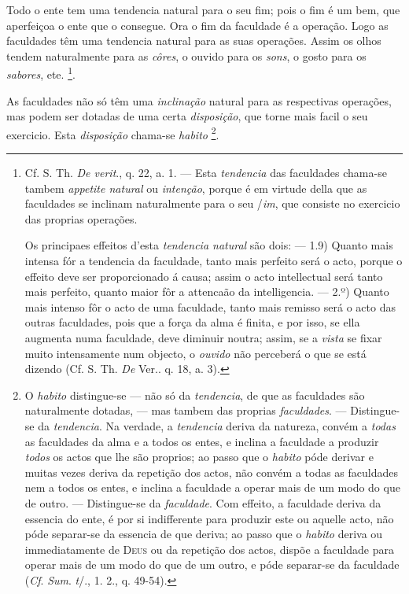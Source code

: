
 
Todo o ente tem uma tendencia natural para o seu fim; pois o fim é um bem, que aperfeiçoa o ente que o consegue. Ora o fim da faculdade é a operação. Logo as faculdades têm uma tendencia natural para as suas operações. Assim os olhos tendem naturalmente para as \emph{côres}, o ouvido para os \emph{sons}, o gosto para os \emph{sabores}, ete. \footnote{Cf. S. Th. \emph{De verit}., q. 22, a. 1. --- Esta \emph{tendencia} das faculdades chama-se tambem \emph{appetite natural} ou \emph{intenção}, porque é em virtude della que as faculdades se inclinam naturalmente para o seu /\emph{im}, que consiste no exercicio das proprias operações.\par Os principaes effeitos d'esta \emph{tendencia natural} são dois: --- 1.9) Quanto mais intensa fór a tendencia da faculdade, tanto mais perfeito será o acto, porque o effeito deve ser proporcionado á causa; assim o acto intellectual será tanto mais perfeito, quanto maior fôr a attencaão da intelligencia. --- 2.º) Quanto mais intenso fôr o acto de uma faculdade, tanto mais remisso será o acto das outras faculdades, pois que a força da alma é finita, e por isso, se ella augmenta numa faculdade, deve diminuir noutra; assim, se a \emph{vista} se fixar muito intensamente num objecto, o \emph{ouvido} não perceberá o que se está dizendo (Cf. S. Th. \emph{De} Ver.. q. 18, a. 3).}.


As faculdades não só têm uma \emph{inclinação} natural para as respectivas operações, mas   podem ser dotadas de uma certa \emph{disposição}, que torne mais facil o seu exercicio. Esta \emph{disposição} chama-se \emph{habito} \footnote{O \emph{habito} distingue-se --- não só da \emph{tendencia}, de que as faculdades são naturalmente dotadas, --- mas tambem das proprias \emph{faculdades}. --- Distingue-se da \emph{tendencia}. Na verdade, a \emph{tendencia} deriva da natureza, convém a \emph{todas} as faculdades da alma e a todos os entes, e inclina a faculdade a produzir \emph{todos} os actos que lhe são proprios; ao passo que o \emph{habito} póde derivar e muitas vezes deriva da repetição dos actos, não convém a todas as faculdades nem a todos os entes, e inclina a faculdade a operar mais de um modo do que de outro. --- Distingue-se da \emph{faculdade}. Com effeito, a faculdade deriva da essencia do ente, é por si indifferente para produzir este ou aquelle acto, não póde separar-se da essencia de que deriva; ao passo que o \emph{habito} deriva ou immediatamente de \textsc{Deus} ou da repetição dos actos, dispõe a faculdade para operar mais de um modo do que de um outro, e póde separar-se da faculdade (\emph{Cf}. \emph{Sum}. \emph{t}/., 1. 2., q. 49-54).}.

